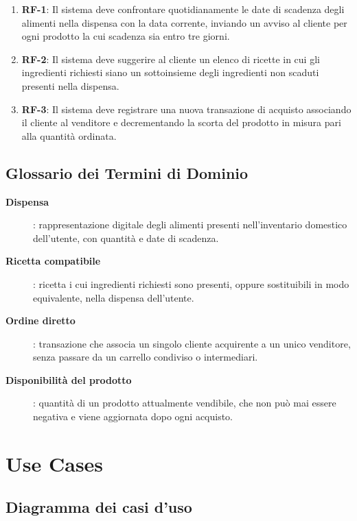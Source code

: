 \begin{enumerate}
    \item \textbf{RF-1}: Il sistema deve confrontare quotidianamente le date di scadenza degli alimenti nella dispensa con la data corrente, inviando un avviso al cliente per ogni prodotto la cui scadenza sia entro tre giorni.
    \item \textbf{RF-2}: Il sistema deve suggerire al cliente un elenco di ricette in cui gli ingredienti richiesti siano un sottoinsieme degli ingredienti non scaduti presenti nella dispensa.
    \item \textbf{RF-3}: Il sistema deve registrare una nuova transazione di acquisto associando il cliente al venditore e decrementando la scorta del prodotto in misura pari alla quantità ordinata.
\end{enumerate}

\subsection{Glossario dei Termini di Dominio}
\begin{description}
    \item[\textbf{Dispensa}]: rappresentazione digitale degli alimenti presenti nell'inventario domestico dell'utente, con quantità e date di scadenza.
    \item[\textbf{Ricetta compatibile}]: ricetta i cui ingredienti richiesti sono presenti, oppure sostituibili in modo equivalente, nella dispensa dell'utente.
    \item[\textbf{Ordine diretto}]: transazione che associa un singolo cliente acquirente a un unico venditore, senza passare da un carrello condiviso o intermediari.
    \item[\textbf{Disponibilità del prodotto}]: quantità di un prodotto attualmente vendibile, che non può mai essere negativa e viene aggiornata dopo ogni acquisto.
\end{description}

\section{Use Cases}
\label{sec:use_cases}

\subsection{Diagramma dei casi d'uso}
\label{subsec:uc_diagramma}

